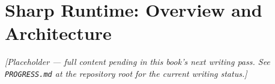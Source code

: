 \chapter{Sharp Runtime: Overview and Architecture}
\label{ch:sharp-runtime-overview}

\emph{[Placeholder --- full content pending in this book's next writing pass. See \texttt{PROGRESS.md} at the repository root for the current writing status.]}
